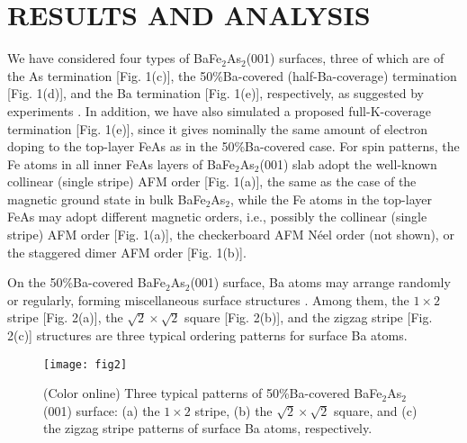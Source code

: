 \documentclass[twocolumn,aps,showpacs,prb]{revtex4-1}
\begin{document}
\section{RESULTS AND ANALYSIS}

We have considered four types of BaFe$_{2}$As$_{2}$(001) surfaces, three of which are of the As termination [Fig. 1(c)], the 50\%Ba-covered (half-Ba-coverage) termination [Fig. 1(d)], and the Ba termination [Fig. 1(e)], respectively, as suggested by experiments \cite{13MasseeF(2009)PRB,15NascimentoVB(2009)PRL,22MasseeF2(2009)PRB,25HuiZhang(2010)PRB}. In addition, we have also simulated a proposed full-K-coverage termination [Fig. 1(e)], since it gives nominally the same amount of electron doping to the top-layer FeAs as in the 50\%Ba-covered case. For spin patterns, the Fe atoms in all inner FeAs layers of BaFe$_{2}$As$_{2}$(001) slab adopt the well-known collinear (single stripe) AFM order [Fig. 1(a)], the same as the case of the magnetic ground state in bulk BaFe$_{2}$As$_{2}$, while the Fe atoms in the top-layer FeAs may adopt different magnetic orders, i.e., possibly the collinear (single stripe) AFM order [Fig. 1(a)], the checkerboard AFM N\'eel order (not shown), or the staggered dimer AFM order [Fig. 1(b)].

On the 50\%Ba-covered BaFe$_{2}$As$_{2}$(001) surface, Ba atoms may arrange randomly or regularly, forming miscellaneous surface structures \cite{13MasseeF(2009)PRB}. Among them, the ${1}\times{2}$ stripe [Fig. 2(a)], the $\sqrt{2}\times\sqrt{2}$ square [Fig. 2(b)], and the zigzag stripe [Fig. 2(c)] structures are three typical ordering patterns for surface Ba atoms.

\begin{figure}[!t]
\texttt{[image: fig2]}
\caption{(Color online) Three typical patterns of 50\%Ba-covered BaFe$_{2}$As$_{2}$(001) surface: (a) the $1\times2$ stripe, (b) the $\sqrt{2}\times\sqrt{2}$ square, and (c) the zigzag stripe patterns of surface Ba atoms, respectively.}
\label{fig2}
\end{figure}
\end{document}
